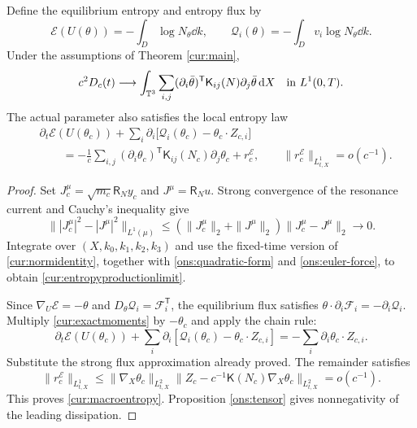 \begin{corollary}\label{cur:entropyproduction}
 Define the equilibrium entropy and entropy flux by
 \[
 \mathcal E(U(\theta))=-\int_D\log N_\theta\dd k,\qquad
 \mathcal Q_i(\theta)=-\int_Dv_i\log N_\theta\dd k.
 \]
 Under the assumptions of Theorem \ref{cur:main},
 \begin{equation}\label{cur:entropyproductionlimit}
 c^2D_c(t)\longrightarrow
 \int_{\mathbb T^3}\sum_{i,j}
 (\partial_i\bar\theta)^{\mathsf T}
       \mathsf K_{ij}(N)\partial_j\bar\theta\,\mathrm d X
       \quad\text{in }L^1(0,T).
 \end{equation}
 The actual parameter also satisfies the local entropy law
 \begin{equation}\label{cur:macroentropy}
 \begin{split}
 &\partial_t\mathcal E(U(\theta_c))
   +\sum_i\partial_i\bigl[\mathcal Q_i(\theta_c)
                                      -\theta_c\cdot Z_{c,i}\bigr]\\
 &\qquad=-\frac1c\sum_{i,j}(\partial_i\theta_c)^{\mathsf T}
                  \mathsf K_{ij}(N_c)\partial_j\theta_c+r_c^{\mathcal E},
 \qquad\|r_c^{\mathcal E}\|_{L^1_{t,X}}=o(c^{-1}).
 \end{split}
 \end{equation}
\end{corollary}
\begin{proof}
 Set $J_c^\mu=\sqrt{m_c}\mathsf R_Ny_c$ and $J^\mu=\mathsf R_Nu$.
 Strong convergence of the resonance current and Cauchy's inequality give
 \[
 \bigl\||J_c^\mu|^2-|J^\mu|^2\bigr\|_{L^1(\mu)}
 \le(\|J_c^\mu\|_2+\|J^\mu\|_2)\|J_c^\mu-J^\mu\|_2\longrightarrow0.
 \]
 Integrate over $(X,k_0,k_1,k_2,k_3)$ and use the fixed-time version of
 \eqref{cur:normidentity}, together with
 \eqref{ons:quadratic-form} and \eqref{ons:euler-force}, to obtain
 \eqref{cur:entropyproductionlimit}.

 Since $\nabla_U\mathcal E=-\theta$ and
 $D_\theta\mathcal Q_i=\mathcal F_i^{\mathsf T}$, the equilibrium
 flux satisfies
 $\theta\cdot\partial_i\mathcal F_i=-\partial_i\mathcal Q_i$.
 Multiply \eqref{cur:exactmoments} by $-\theta_c$ and apply the chain rule:
 \[
 \partial_t\mathcal E(U(\theta_c))
 +\sum_i\partial_i[\mathcal Q_i(\theta_c)-\theta_c\cdot Z_{c,i}]
       =-\sum_i\partial_i\theta_c\cdot Z_{c,i}.
 \]
 Substitute the strong flux approximation already proved. The remainder
 satisfies
 \[
 \|r_c^{\mathcal E}\|_{L^1_{t,X}}
 \le\|\nabla_X\theta_c\|_{L^2_{t,X}}
     \|Z_c-c^{-1}\mathsf K(N_c)\nabla_X\theta_c\|_{L^2_{t,X}}
       =o(c^{-1}).
 \]
 This proves \eqref{cur:macroentropy}.
 Proposition \ref{ons:tensor} gives nonnegativity of the leading
 dissipation.
\end{proof}

